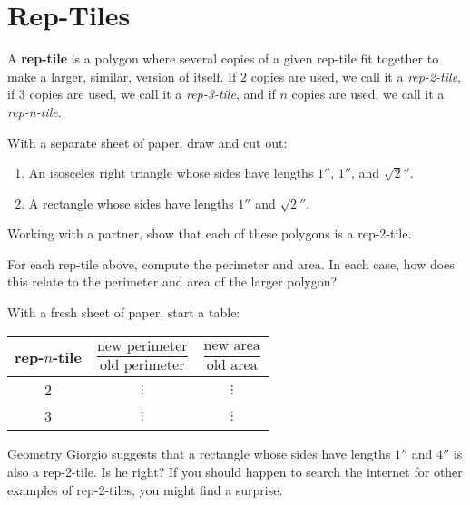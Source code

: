 \newpage
\section{Rep-Tiles}

A \textbf{rep-tile} is a polygon where several copies of
a given rep-tile fit together to make a larger, similar, version of
itself. If $2$ copies are used, we call it a \textit{rep-2-tile}, if
$3$ copies are used, we call it a \textit{rep-3-tile}, and if $n$ copies
are used, we call it a \textit{rep-n-tile}.


\begin{prob}
With a separate sheet of paper, draw and cut out:
\begin{enumerate}
\item An isosceles right triangle whose sides have lengths $1''$, $1''$, and $\sqrt{2}''$.
\item A rectangle whose sides have lengths $1''$ and $\sqrt{2}''$.
\end{enumerate}
Working with a partner, show that each of these polygons is a rep-2-tile.
\end{prob}

\begin{prob}
For each rep-tile above, compute the perimeter and area. In each case,
how does this relate to the perimeter and area of the larger polygon?
\end{prob}



\begin{prob}
With a fresh sheet of paper, start a table:
\begin{center}
\begin{tabular}{c|c|c}
rep-$n$-tile & $\dfrac{\text{new perimeter}}{\text{old perimeter}}$ & $\dfrac{\text{new area}}{\text{old area}}$  \\
\hline\hline
 2 & $\vdots$  &  $\vdots$  \\ 
3 & $\vdots$  &  $\vdots$  \\ 
\end{tabular}
\end{center}
\end{prob}


\begin{prob}
Geometry Giorgio suggests that a rectangle whose sides have lengths
$1''$ and $4''$ is also a rep-2-tile. Is he right? If you should
happen to search the internet for other examples of rep-2-tiles, you
might find a surprise.
\end{prob}



